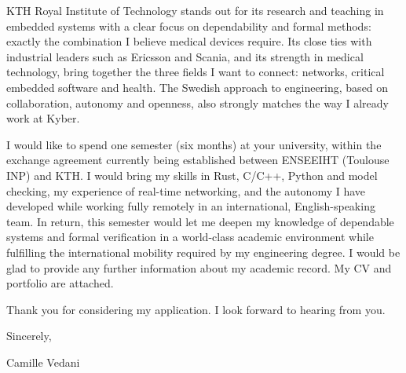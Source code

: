 \documentclass[11pt]{article}
\newcommand{\myname}{Camille Vedani}
\begin{document}
KTH Royal Institute of Technology stands out for its research and teaching in embedded systems with a clear
focus on dependability and formal methods: exactly the combination I believe medical devices require. Its
close ties with industrial leaders such as Ericsson and Scania, and its strength in medical technology,
bring together the three fields I want to connect: networks, critical embedded software and health. The
Swedish approach to engineering, based on collaboration, autonomy and openness, also strongly matches the
way I already work at Kyber.

I would like to spend one semester (six months) at your university, within the exchange agreement currently being established between ENSEEIHT (Toulouse INP) and KTH. I would bring
my skills in Rust, C/C++, Python and model checking, my experience of real-time networking, and the autonomy I have developed while working fully remotely in an international,
English-speaking team. In return, this semester would let me deepen my knowledge of dependable systems and formal verification in a world-class academic
environment while fulfilling the
international mobility required by my engineering degree. I would be glad to provide any further
information about my academic record. My CV and portfolio are attached.

Thank you for considering my application. I look forward to hearing from you.

Sincerely,

\vspace{1.8em}
\myname
\end{document}
